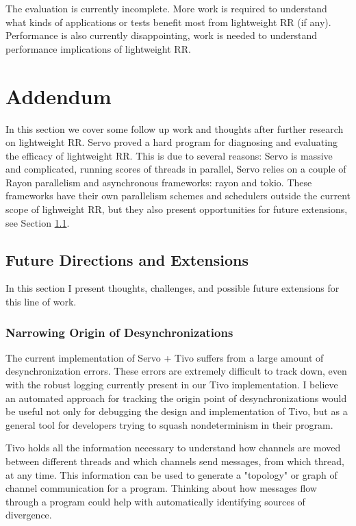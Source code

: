 The evaluation is currently incomplete. More work is required to understand what kinds
of applications or tests benefit most from lightweight RR (if any). Performance is also
currently disappointing, work is needed to understand performance implications of lightweight
RR.

\section{Addendum}
In this section we cover some follow up work and thoughts after further research on lightweight RR. Servo proved a hard program for diagnosing and evaluating the efficacy of lightweight RR. This is due to several reasons: Servo is massive and complicated, running scores of threads in parallel, Servo relies on a couple of Rayon parallelism and asynchronous frameworks: rayon and tokio. These frameworks have their own parallelism schemes and schedulers outside the current scope of lighweight RR, but they also present opportunities for future extensions, see Section \ref{sec:tivo-future}.

\subsection{Future Directions and Extensions} \label{sec:tivo-future}
In this section I present thoughts, challenges, and possible future extensions for this line of work.

\subsubsection{Narrowing Origin of Desynchronizations}
The current implementation of Servo + Tivo suffers from a large amount of desynchronization errors. These errors are extremely difficult to track down, even with the robust logging currently present in our Tivo implementation. I believe an automated approach for tracking the origin point of desynchronizations would be useful not only for debugging the design and implementation of Tivo, but as a general tool for developers trying to squash nondeterminism in their program.

Tivo holds all the information necessary to understand how channels are moved between different threads and which channels send messages, from which thread, at any time. This information can be used to generate a "topology" or graph of channel communication for a program. Thinking about how messages flow through a program could help with automatically identifying sources of divergence.

